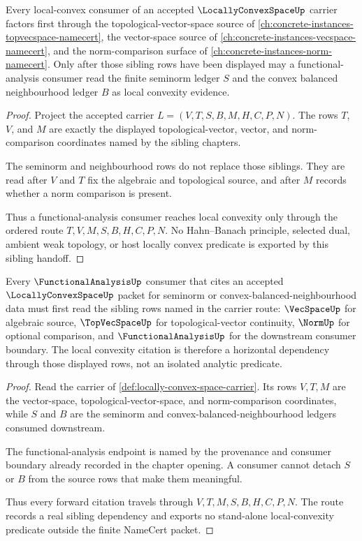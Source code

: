 \begin{theorem}
\label{thm:locally-convex-space-topvecspace-seminorm-route}
Every local-convex consumer of an accepted $\LocallyConvexSpaceUp$ carrier factors first through the topological-vector-space source of \autoref{ch:concrete-instances-topvecspace-namecert}, the vector-space source of \autoref{ch:concrete-instances-vecspace-namecert}, and the norm-comparison surface of \autoref{ch:concrete-instances-norm-namecert}. Only after those sibling rows have been displayed may a functional-analysis consumer read the finite seminorm ledger $S$ and the convex balanced neighbourhood ledger $B$ as local convexity evidence.
\end{theorem}
\begin{proof}
Project the accepted carrier $L=(V,T,S,B,M,H,C,P,N)$. The rows $T$, $V$, and $M$ are exactly the displayed topological-vector, vector, and norm-comparison coordinates named by the sibling chapters.

The seminorm and neighbourhood rows do not replace those siblings. They are read after $V$ and $T$ fix the algebraic and topological source, and after $M$ records whether a norm comparison is present.

Thus a functional-analysis consumer reaches local convexity only through the ordered route $T,V,M,S,B,H,C,P,N$. No Hahn--Banach principle, selected dual, ambient weak topology, or host locally convex predicate is exported by this sibling handoff.
\end{proof}

\begin{theorem}
\label{thm:locally-convex-space-forward-citation}
Every $\FunctionalAnalysisUp$ consumer that cites an accepted $\LocallyConvexSpaceUp$ packet for seminorm or convex-balanced-neighbourhood data must first read the sibling rows named in the carrier route: $\VecSpaceUp$ for algebraic source, $\TopVecSpaceUp$ for topological-vector continuity, $\NormUp$ for optional comparison, and $\FunctionalAnalysisUp$ for the downstream consumer boundary. The local convexity citation is therefore a horizontal dependency through those displayed rows, not an isolated analytic predicate.
\end{theorem}
\begin{proof}
Read the carrier of \autoref{def:locally-convex-space-carrier}. Its rows $V,T,M$ are the vector-space, topological-vector-space, and norm-comparison coordinates, while $S$ and $B$ are the seminorm and convex-balanced-neighbourhood ledgers consumed downstream.

The functional-analysis endpoint is named by the provenance and consumer boundary already recorded in the chapter opening. A consumer cannot detach $S$ or $B$ from the source rows that make them meaningful.

Thus every forward citation travels through $V,T,M,S,B,H,C,P,N$. The route records a real sibling dependency and exports no stand-alone local-convexity predicate outside the finite NameCert packet.
\end{proof}

